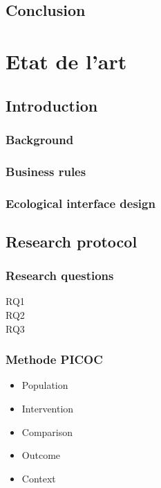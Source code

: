 \documentclass[a4paper,12pt]{article}
\begin{document}
\subsection{Conclusion}
\label{sec:orga21397f}
\clearpage
\section{Etat de l'art}
\label{sec:orgad7d695}
\subsection{Introduction}
\label{sec:org92754c3}

\subsubsection{Background}
\label{sec:org2e80a26}
\subsubsection{Business rules}
\label{sec:org17ed728}

\subsubsection{Ecological interface design}
\label{sec:org26e74f7}
\subsection{Research protocol}
\label{sec:org5cbe250}
\subsubsection{Research questions}
\label{sec:orgd41bb0e}
\begin{description}
\item[{RQ1}] 

\item[{RQ2}] 

\item[{RQ3}] 
\end{description}
\subsubsection{Methode PICOC}
\label{sec:orgd9b6181}
\begin{itemize}
\item Population
\item Intervention
\item Comparison
\item Outcome
\item Context
\end{itemize}
\end{document}
